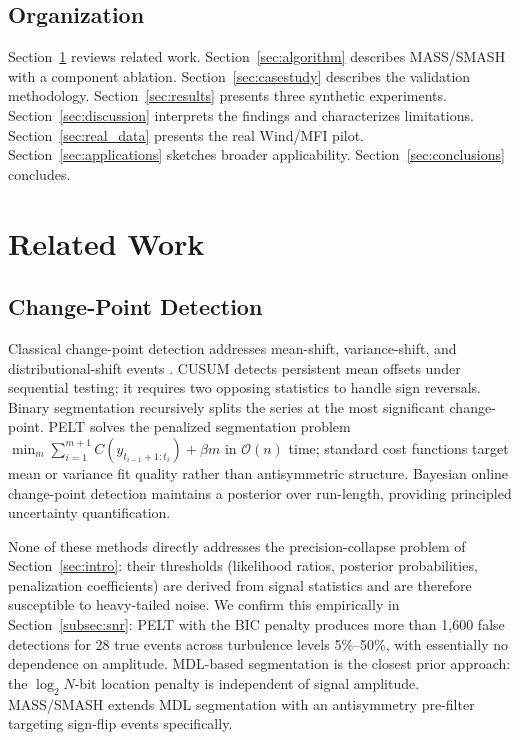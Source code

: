 \documentclass[12pt,letterpaper]{article}
\begin{document}
\subsection{Organization}

Section~\ref{sec:related} reviews related work.
Section~\ref{sec:algorithm} describes MASS/SMASH with a component ablation.
Section~\ref{sec:casestudy} describes the validation methodology.
Section~\ref{sec:results} presents three synthetic experiments.
Section~\ref{sec:discussion} interprets the findings and characterizes
limitations.
Section~\ref{sec:real_data} presents the real Wind/MFI pilot.
Section~\ref{sec:applications} sketches broader applicability.
Section~\ref{sec:conclusions} concludes.

\section{Related Work}
\label{sec:related}

\subsection{Change-Point Detection}

Classical change-point detection addresses mean-shift, variance-shift,
and distributional-shift events \citep{Basseville1993,Truong2020}.
CUSUM \citep{Page1954} detects persistent mean offsets under sequential
testing; it requires two opposing statistics to handle sign reversals.
Binary segmentation \citep{Vostrikova1981} recursively splits the series at the
most significant change-point.
PELT \citep{Killick2012} solves the penalized segmentation problem
$\min_m \sum_{i=1}^{m+1} C(y_{t_{i-1}+1:t_i}) + \beta m$ in
$\mathcal{O}(n)$ time; standard cost functions target mean or variance fit
quality rather than antisymmetric structure.
Bayesian online change-point detection \citep{AdamsMacKay2007} maintains a
posterior over run-length, providing principled uncertainty quantification.

None of these methods directly addresses the precision-collapse problem of
Section~\ref{sec:intro}: their thresholds (likelihood ratios, posterior
probabilities, penalization coefficients) are derived from signal statistics
and are therefore susceptible to heavy-tailed noise.
We confirm this empirically in Section~\ref{subsec:snr}: PELT with the BIC
penalty produces more than 1{,}600 false detections for 28 true events across
turbulence levels 5\%--50\%, with essentially no dependence on amplitude.
MDL-based segmentation \citep{Rissanen1978,Davis2006} is the closest
prior approach: the $\log_2 N$-bit location penalty is independent of signal
amplitude.
MASS/SMASH extends MDL segmentation with an antisymmetry pre-filter
targeting sign-flip events specifically.
\end{document}
